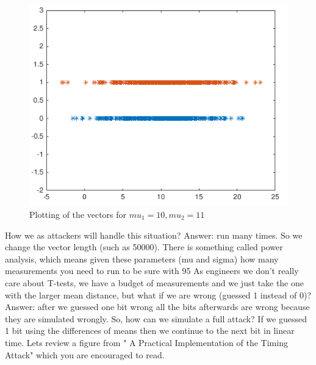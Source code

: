 \begin{figure}[H]
    \centering
    \includegraphics[scale=0.6]{images/defmatplot2.png}
    \caption{Plotting of the vectors for \(mu_1 = 10, mu_2 = 11\)} \label{defmatplot2:fig}
\end{figure}

How we as attackers will handle this situation? Answer: run many times. So we change the vector length (such as 50000). There is something called power analysis, which means given these parameters (mu and sigma) how many measurements you need to run to be sure with 95%
As engineers we don’t really care about T-tests, we have a budget of measurements and we just take the one with the larger mean distance, but what if we are wrong (guessed 1 instead of 0)? Answer: after we guessed one bit wrong all the bits afterwards are wrong because they are simulated wrongly.
So, how can we simulate a full attack? If we guessed 1 bit using the differences of means then we continue to the next bit in linear time. Lets review  a figure from " A Practical Implementation of the Timing Attack" which you are encouraged to read.


